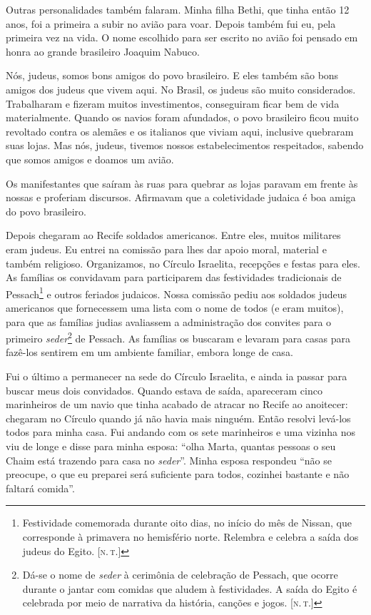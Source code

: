 Outras personalidades também falaram. Minha filha Bethi, que tinha
então 12 anos, foi a primeira a subir no avião para voar. Depois também fui eu, pela primeira vez na vida. O nome escolhido para ser escrito no avião foi pensado em honra ao grande brasileiro Joaquim Nabuco.

Nós, judeus, somos bons amigos do povo brasileiro. E eles também são bons
amigos dos judeus que vivem aqui. No Brasil, os judeus são muito
considerados. Trabalharam e fizeram muitos investimentos, conseguiram ficar bem de vida materialmente. Quando os navios foram afundados, o povo brasileiro ficou muito revoltado contra os alemães e
os italianos que viviam aqui, inclusive quebraram suas lojas. Mas nós, judeus,
tivemos nossos estabelecimentos respeitados, sabendo que somos amigos e
doamos um avião.

Os manifestantes que saíram às ruas para quebrar as lojas paravam em
frente às nossas e proferiam discursos. Afirmavam que a
coletividade judaica é boa amiga do povo brasileiro.

Depois chegaram ao Recife soldados americanos. Entre eles, muitos
militares eram judeus. Eu entrei na comissão para lhes dar apoio moral,
material e também religioso. Organizamos, no Círculo Israelita,
recepções e festas para eles. As famílias os convidavam para
participarem das festividades tradicionais de Pessach\footnote{Festividade
  comemorada durante oito dias, no início do mês de Nissan, que
  corresponde à primavera no hemisfério norte. Relembra e celebra a
  saída dos judeus do Egito. {[}\textsc{n.\,t.}{]}} e outros feriados judaicos. Nossa comissão
pediu aos soldados judeus americanos que fornecessem uma lista com o
nome de todos (e eram muitos), para que as famílias
judias avaliassem a administração dos convites para o primeiro
\textit{seder}\footnote{Dá-se o nome de \textit{seder} à cerimônia de celebração de
  Pessach, que ocorre durante o jantar com comidas que aludem à festividades. A saída do Egito é celebrada por meio de narrativa da história, canções e jogos. {[}\textsc{n.\,t.}{]}} de Pessach. As famílias os buscaram e levaram para casas para fazê-los sentirem em um ambiente familiar, embora longe de casa.

Fui o último a permanecer na sede do Círculo Israelita, e ainda ia passar
para buscar meus dois convidados. Quando
estava de saída, apareceram cinco marinheiros de um navio que tinha
acabado de atracar no Recife ao anoitecer: chegaram no Círculo quando
já não havia mais ninguém. Então resolvi levá-los todos para minha casa.
Fui andando com os sete marinheiros e uma vizinha nos viu de longe e
disse para minha esposa: ``olha Marta, quantas pessoas o seu Chaim está
trazendo para casa no \textit{seder}''. Minha esposa respondeu ``não se
preocupe, o que eu preparei será suficiente para todos, cozinhei
bastante e não faltará comida''. 

